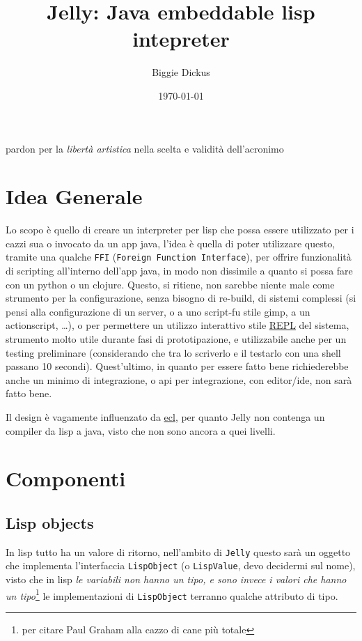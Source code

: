 \documentclass[11pt]{article}
\author{Biggie Dickus}
\date{\today}
\title{Jelly: Java embeddable lisp intepreter}
\begin{document}
\maketitle
\tableofcontents

pardon per la \emph{libertà artistica} nella scelta e validità dell'acronimo
\section{Idea Generale}
\label{sec:orgac85115}
Lo scopo è quello di creare un interpreter per lisp che possa essere utilizzato per i cazzi sua o invocato da un app java, l'idea è quella di poter utilizzare questo, tramite una qualche \texttt{FFI} (\texttt{Foreign Function Interface}), per offrire funzionalità di scripting all'interno dell'app java, in modo non dissimile a quanto si possa fare con un python o un clojure.
Questo, si ritiene, non sarebbe niente male come strumento per la configurazione, senza bisogno di re-build, di sistemi complessi (si pensi alla configurazione di un server, o a uno script-fu stile gimp, a un actionscript, \ldots{}), o per permettere un utilizzo interattivo stile \href{https://en.wikipedia.org/wiki/Read\%E2\%80\%93eval\%E2\%80\%93print\_loop}{REPL} del sistema, strumento molto utile durante fasi di prototipazione, e utilizzabile anche per un testing preliminare (considerando che tra lo scriverlo e il testarlo con una shell passano 10 secondi).
Quest'ultimo, in quanto per essere fatto bene richiederebbe anche un minimo di integrazione, o api per integrazione, con editor/ide, non sarà fatto bene.

Il design è vagamente influenzato da \href{https://gitlab.com/embeddable-common-lisp/ecl/}{ecl}, per quanto Jelly non contenga un compiler da lisp a java, visto che non sono ancora a quei livelli.

\section{Componenti}
\label{sec:orge28f9c1}
\subsection{Lisp objects}
\label{sec:org1bb97b7}
In lisp tutto ha un valore di ritorno, nell'ambito di \texttt{Jelly} questo sarà un oggetto che implementa l'interfaccia \texttt{LispObject} (o \texttt{LispValue}, devo decidermi sul nome), visto che in lisp \emph{le variabili non hanno un tipo, e sono invece i valori che hanno un tipo}\footnote{per citare Paul Graham alla cazzo di cane più totale} le implementazioni di \texttt{LispObject} terranno qualche attributo di tipo.
\end{document}
